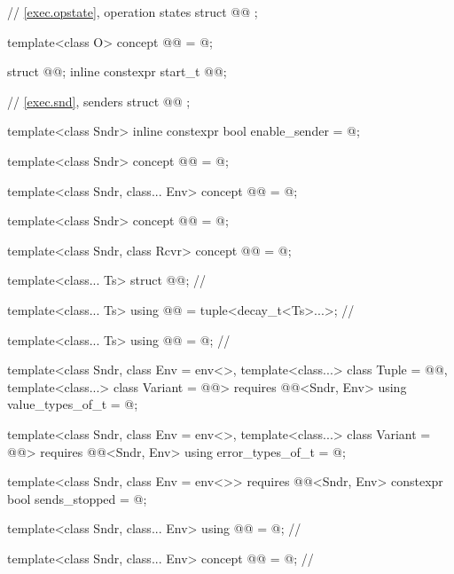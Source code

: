 \begin{codeblock}
{  // \ref{exec.opstate}, operation states
  struct @@ {};

  template<class O>
    concept @@ = @\seebelow@;

  struct @@;
  inline constexpr start_t @@{};

  // \ref{exec.snd}, senders
  struct @@ {};

  template<class Sndr>
    inline constexpr bool enable_sender = @\seebelow@;

  template<class Sndr>
    concept @@ = @\seebelow@;

  template<class Sndr, class... Env>
    concept @@ = @\seebelow@;

  template<class Sndr>
    concept @@ = @\seebelow@;

  template<class Sndr, class Rcvr>
    concept @@ = @\seebelow@;

  template<class... Ts>
    struct @@;                                           // \expos

  template<class... Ts>
    using @@ = tuple<decay_t<Ts>...>;                // \expos

  template<class... Ts>
    using @@ = @\seebelownc@;                         // \expos

  template<class Sndr, class Env = env<>,
           template<class...> class Tuple = @@,
           template<class...> class Variant = @@>
      requires @@<Sndr, Env>
    using value_types_of_t = @\seebelow@;

  template<class Sndr, class Env = env<>,
           template<class...> class Variant = @@>
      requires @@<Sndr, Env>
    using error_types_of_t = @\seebelow@;

  template<class Sndr, class Env = env<>>
      requires @@<Sndr, Env>
    constexpr bool sends_stopped = @\seebelow@;

  template<class Sndr, class... Env>
    using @@ = @\seebelownc@;                 // \expos

  template<class Sndr, class... Env>
    concept @@ = @\seebelow@;                         // \expos

}
\end{codeblock}
